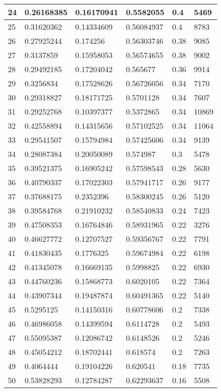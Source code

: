 \begin{longtable}{|l|l|l|l|l|l|}
24 & 0.26168385 & 0.16170941 & 0.5582055 & 0.4 & 5469 \\ \hline 
25 & 0.31620362 & 0.14334609 & 0.56084937 & 0.4 & 8783 \\ \hline 
26 & 0.27925244 & 0.174256 & 0.56303746 & 0.38 & 9085 \\ \hline 
27 & 0.3137859 & 0.15958053 & 0.56574655 & 0.38 & 9002 \\ \hline 
28 & 0.29492185 & 0.17204042 & 0.565677 & 0.36 & 9914 \\ \hline 
29 & 0.3256834 & 0.17528626 & 0.56726056 & 0.34 & 7170 \\ \hline 
30 & 0.29318827 & 0.18171725 & 0.5701128 & 0.34 & 7607 \\ \hline 
31 & 0.29252768 & 0.10397377 & 0.5372865 & 0.34 & 10869 \\ \hline 
32 & 0.42558894 & 0.14315656 & 0.57102525 & 0.34 & 11064 \\ \hline 
33 & 0.29541507 & 0.15794984 & 0.57425606 & 0.34 & 9139 \\ \hline 
34 & 0.28087384 & 0.20050089 & 0.574987 & 0.3 & 5478 \\ \hline 
35 & 0.39521375 & 0.16905242 & 0.57598543 & 0.28 & 5630 \\ \hline 
36 & 0.40790337 & 0.17022303 & 0.57941717 & 0.26 & 9177 \\ \hline 
37 & 0.37688175 & 0.2352396 & 0.58300245 & 0.26 & 5120 \\ \hline 
38 & 0.39584768 & 0.21910232 & 0.58540833 & 0.24 & 7423 \\ \hline 
39 & 0.47508353 & 0.16764846 & 0.58931965 & 0.22 & 3276 \\ \hline 
40 & 0.46627772 & 0.12707527 & 0.59356767 & 0.22 & 7791 \\ \hline 
41 & 0.41830435 & 0.1776325 & 0.59674984 & 0.22 & 6198 \\ \hline 
42 & 0.41345078 & 0.16669135 & 0.5998825 & 0.22 & 6930 \\ \hline 
43 & 0.44760236 & 0.15868773 & 0.6020105 & 0.22 & 7364 \\ \hline 
44 & 0.43907344 & 0.19487874 & 0.60491365 & 0.22 & 5140 \\ \hline 
45 & 0.5295125 & 0.14150316 & 0.60778606 & 0.2 & 7338 \\ \hline 
46 & 0.46986058 & 0.14399594 & 0.6114728 & 0.2 & 5493 \\ \hline 
47 & 0.55095387 & 0.12086742 & 0.6148526 & 0.2 & 5246 \\ \hline 
48 & 0.45054212 & 0.18702441 & 0.618574 & 0.2 & 7263 \\ \hline 
49 & 0.4064444 & 0.19104226 & 0.620541 & 0.18 & 7735 \\ \hline 
50 & 0.53828293 & 0.12784287 & 0.62293637 & 0.16 & 5508 \\ \hline 
\end{longtable}